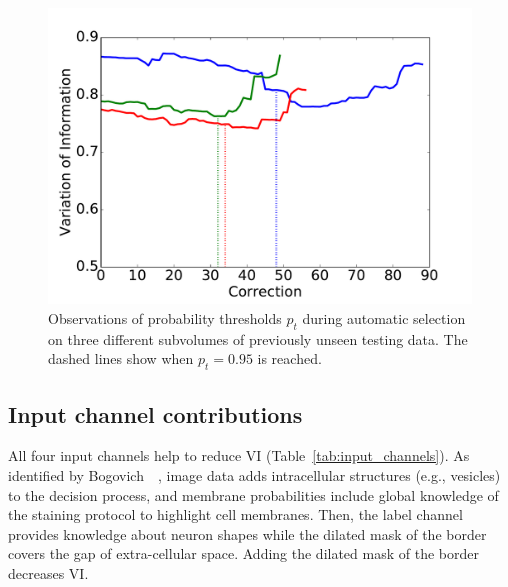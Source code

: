 \begin{figure}[t]
\centering
\includegraphics[width=\linewidth]{gfx/ptplot.pdf}
\caption{Observations of probability thresholds $p_t$ during automatic selection on three different subvolumes of previously unseen testing data. The dashed lines show when $p_t=0.95$ is reached.}
\label{fig:thresh}
\end{figure}



\subsection{Input channel contributions} 

All four input channels help to reduce VI (Table~\ref{tab:input_channels}). As identified by Bogovich~\etal~\cite{BogovicHJ13}, image data adds intracellular structures (e.g., vesicles) to the decision process, and membrane probabilities include global knowledge of the staining protocol to highlight cell membranes. Then, the label channel provides knowledge about neuron shapes while the dilated mask of the border covers the gap of extra-cellular space. Adding the dilated mask of the border decreases VI. %

